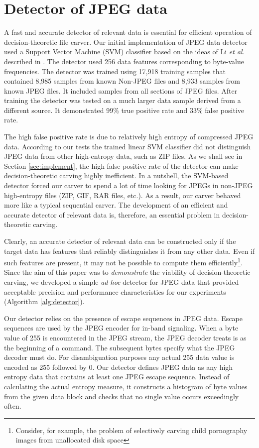 \documentclass[final,5p,times,twocolumn,authoryear]{elsarticle}
\begin{document}
\section{Detector of JPEG data}
\label{sec:detector}

A fast and accurate detector of relevant data is essential for efficient operation of decision-theoretic file carver. Our initial implementation of JPEG data detector used a Support Vector Machine (SVM) classifier based on the ideas of Li \emph{et al.} described in \citep{li2011novel}. The detector used 256 data features corresponding to byte-value frequencies. The detector was trained using 17,918 training samples that contained 8,985 samples from known Non-JPEG files and 8,933 samples from known JPEG files. It included samples from all sections of JPEG files. After training the detector was tested on a much larger data sample derived from a different source. It demonstrated 99\% true positive rate and 33\% false positive rate. 

The high false positive rate is due to relatively high entropy of compressed JPEG data. According to our tests the trained linear SVM classifier did not distinguish JPEG data from other high-entropy data, such as ZIP files. As we shall see in Section \ref{sec:implement}, the high false positive rate of the detector can make decision-theoretic carving highly inefficient. In a nutshell, the SVM-based detector forced our carver to spend a lot of time looking for JPEGs in non-JPEG high-entropy files (ZIP, GIF, RAR files, etc.). As a result, our carver behaved more like a typical sequential carver. The development of an efficient and accurate detector of relevant data is, therefore, an essential problem in decision-theoretic carving. 

Clearly, an accurate detector of relevant data can be constructed only if the target data has features that reliably distinguishes it from any other data. Even if such features are present, it may not be possible to compute them efficiently\footnote{Consider, for example, the problem of selectively carving child pornography images from unallocated disk space}. Since the aim of this paper was to \emph{demonstrate} the viability of decision-theoretic carving, we developed a simple \emph{ad-hoc} detector for JPEG data that provided acceptable precision and performance characteristics for our experiments (Algorithm \ref{alg:detector}).  

Our detector relies on the presence of escape sequences in JPEG data. Escape sequences are used by the JPEG encoder for in-band signaling. When a byte value of 255 is encountered in the JPEG stream, the JPEG decoder treats is as the beginning of a command. The subsequent bytes specify what the JPEG decoder must do. For disambiguation purposes any actual 255 data value is encoded as 255 followed by 0. Our detector defines JPEG data as any high entropy data that contains at least one JPEG escape sequence. Instead of calculating the actual entropy measure, it constructs a histogram of byte values from the given data block and checks that no single value occurs exceedingly often.
\end{document}
